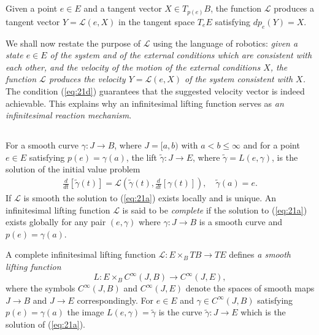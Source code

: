 \documentclass[11pt]{amsart}
\begin{document}
{\subsection{} Given a point $e\in E$ and a tangent vector $X\in T_{p(e)}B$, the function $\mathcal L$ produces a tangent vector $Y=\mathcal L(e, X)$ in the tangent space $T_eE$ satisfying $dp_e(Y)=X$. 

We shall now restate the purpose of $\mathcal L$ using the language of robotics: {\it given a state $e\in E$ of the system and of the external conditions which are consistent with each other, and the velocity of the motion of the external conditions $X$, the function $\mathcal L$ produces the velocity $Y=\mathcal L(e, X)$ of the system consistent with $X$.} The condition (\ref{eq:21d}) guarantees that the suggested velocity vector is indeed achievable.
This explains why an infinitesimal lifting function serves as {\it an infinitesimal reaction mechanism}. 

\subsection{}\label{sec:44} For a smooth curve $\gamma: J\to B$, where $J=[a, b)$ with $a<b\le \infty$ and for a point $e\in E$ satisfying $p(e)=\gamma(a)$, the lift $\tilde \gamma: J\to E$, where $\tilde \gamma=L(e, \gamma)$, is the solution of the initial value problem 
\begin{eqnarray}\label{eq:21a}
\frac{d}{dt}\left[\tilde\gamma(t)\right] = \mathcal L\left(\tilde\gamma(t), \frac{d}{dt}\left[\gamma(t)\right]\right), \quad \tilde \gamma(a)=e. 
\end{eqnarray}
If $\mathcal L$ is smooth the solution to (\ref{eq:21a}) exists locally and is unique. 
An infinitesimal lifting function $\mathcal L$  is said to be {\it complete} if the solution to (\ref{eq:21a}) exists globally for any pair 
$(e, \gamma)$ where $\gamma: J\to B$ is a smooth curve and  $p(e)=\gamma(a)$. 

A complete infinitesimal lifting function $\mathcal L: E\times_B TB\to TE$ defines {\it a smooth lifting function} 
$$
L: E\times_BC^{\infty}(J,B)\to C^{\infty}(J, E),
$$ 
where the symbols $C^{\infty}(J,B)$ and $C^{\infty}(J, E)$ denote the spaces of smooth maps $J\to B$ and $J\to E$ correspondingly. 
For $e\in E$ and $\gamma\in C^{\infty}(J,B)$ satisfying $p(e)=\gamma(a)$ the image $L(e, \gamma)=\tilde \gamma$ is the curve $\tilde\gamma: J\to E$ which is the solution of (\ref{eq:21a}). 



}
\end{document}
